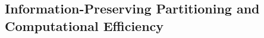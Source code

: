 \documentclass[sigconf]{acmart}
\begin{document}












\subsection{Information-Preserving Partitioning and Computational Efficiency} \label{text:3-6}
\end{document}
